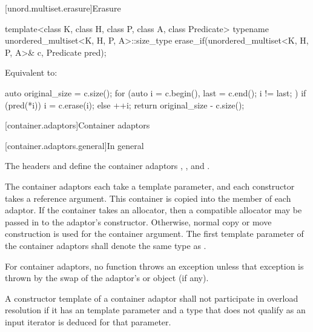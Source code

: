 [unord.multiset.erasure]{Erasure}

%
\begin{itemdecl}
template<class K, class H, class P, class A, class Predicate>
  typename unordered_multiset<K, H, P, A>::size_type
    erase_if(unordered_multiset<K, H, P, A>& c, Predicate pred);
\end{itemdecl}

\begin{itemdescr}
\pnum
\effects
Equivalent to:
\begin{codeblock}
auto original_size = c.size();
for (auto i = c.begin(), last = c.end(); i != last; ) {
  if (pred(*i)) {
    i = c.erase(i);
  } else {
    ++i;
  }
}
return original_size - c.size();
\end{codeblock}
\end{itemdescr}

[container.adaptors]{Container adaptors}

[container.adaptors.general]{In general}

\pnum
The headers  and  define the container adaptors
, , and .

\pnum
The container adaptors each take a  template parameter, and each constructor takes
a  reference argument. This container is copied into the  member
of each adaptor. If the container takes an allocator, then a compatible allocator may be passed in
to the adaptor's constructor. Otherwise, normal copy or move construction is used for the container
argument.
The first template parameter  of the container adaptors
shall denote the same type as .

\pnum
For container adaptors, no  function throws an exception unless that
exception is thrown by the swap of the adaptor's  or
 object (if any).

\pnum
A constructor template of a container adaptor
shall not participate in overload resolution
if it has an  template parameter and
a type that does not qualify as an input iterator is deduced for that parameter.

